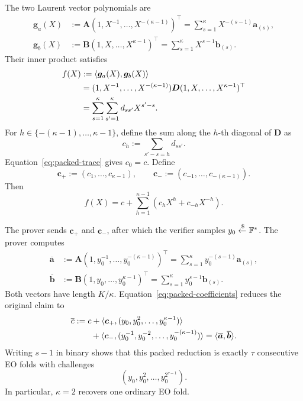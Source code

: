 The two Laurent vector polynomials are
\begin{align*}
    \bm g_a(X)
    &:=\bm A(1,X^{-1},\ldots,X^{-(\kappa-1)})^\top
      =\sum_{s=1}^{\kappa}X^{-(s-1)}\bm a_{(s)}, \\
    \bm g_b(X)
    &:=\bm B(1,X,\ldots,X^{\kappa-1})^\top
      =\sum_{s=1}^{\kappa}X^{s-1}\bm b_{(s)}.
\end{align*}
Their inner product satisfies
\begin{align}
\label{eq:packed-laurent}
    f(X)
    &:=\langle\bm g_a(X),\bm g_b(X)\rangle \notag\\
    &=(1,X^{-1},\ldots,X^{-(\kappa-1)})
      \bm D
      (1,X,\ldots,X^{\kappa-1})^\top \notag\\
    &=\sum_{s=1}^{\kappa}\sum_{s'=1}^{\kappa}
      d_{ss'}X^{s'-s}.
\end{align}
For $h\in\{-(\kappa-1),\ldots,\kappa-1\}$, define the sum along the
$h$-th diagonal of $\bm D$ as
\[
    c_h:=\sum_{s'-s=h}d_{ss'}.
\]
Equation~\eqref{eq:packed-trace} gives $c_0=c$. Define
\[
    \bm c_+:=(c_1,\ldots,c_{\kappa-1}),
    \qquad
    \bm c_-:=(c_{-1},\ldots,c_{-(\kappa-1)}).
\]
Then
\begin{equation}
\label{eq:packed-coefficients}
    f(X)=c+\sum_{h=1}^{\kappa-1}
    \left(c_hX^h+c_{-h}X^{-h}\right).
\end{equation}

The prover sends $\bm c_+$ and $\bm c_-$, after which the verifier samples
$y_0\mathrel{\xleftarrow{\$}}{\mathbb{F}}^*$. The prover computes
\begin{align*}
    \overline{\bm a}
    &:=\bm A(1,y_0^{-1},\ldots,y_0^{-(\kappa-1)})^\top
      =\sum_{s=1}^{\kappa}y_0^{-(s-1)}\bm a_{(s)}, \\
    \overline{\bm b}
    &:=\bm B(1,y_0,\ldots,y_0^{\kappa-1})^\top
      =\sum_{s=1}^{\kappa}y_0^{s-1}\bm b_{(s)}.
\end{align*}
Both vectors have length $K/\kappa$. Equation~\eqref{eq:packed-coefficients}
reduces the original claim to
\begin{align}
\label{eq:packed-eo-claim}
    \overline c
    &:=c
      +\langle\bm c_+,(y_0,y_0^2,\ldots,y_0^{\kappa-1})\rangle \notag\\
    &\qquad
      +\langle\bm c_-,(y_0^{-1},y_0^{-2},\ldots,y_0^{-(\kappa-1)})\rangle
      =\langle\overline{\bm a},\overline{\bm b}\rangle.
\end{align}
Writing $s-1$ in binary shows that this packed reduction is exactly $\tau$
consecutive EO folds with challenges
\[
    (y_0,y_0^2,\ldots,y_0^{2^{\tau-1}}).
\]
In particular, $\kappa=2$ recovers one ordinary EO fold.

